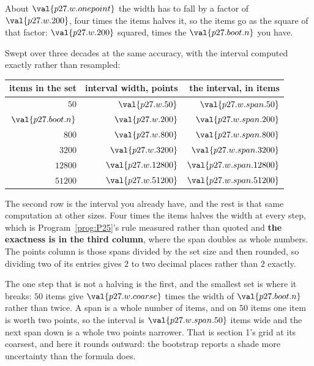 \begin{fr}
\begin{ansblock}
About $\val{p27.w.onepoint}$ \dash{} the width has to fall by a factor of
$\val{p27.w.200}$, four times the items halves it, so the items go as the
square of that factor: $\val{p27.w.200}$ squared, times the
$\val{p27.boot.n}$ you have.
\end{ansblock}

Swept over three decades at the same accuracy, with the interval computed
exactly rather than resampled:

\begin{center}
\begin{tabular}{rrr}
\toprule
items in the set & interval width, points & the interval, in items \\
\midrule
$50$ & $\val{p27.w.50}$ & $\val{p27.w.span.50}$ \\
$\val{p27.boot.n}$ & $\val{p27.w.200}$ & $\val{p27.w.span.200}$ \\
$800$ & $\val{p27.w.800}$ & $\val{p27.w.span.800}$ \\
$\num{3200}$ & $\val{p27.w.3200}$ & $\val{p27.w.span.3200}$ \\
$\num{12800}$ & $\val{p27.w.12800}$ & $\val{p27.w.span.12800}$ \\
$\num{51200}$ & $\val{p27.w.51200}$ & $\val{p27.w.span.51200}$ \\
\bottomrule
\end{tabular}
\end{center}

The second row is the interval you already have, and the rest is that same
computation at other sizes. Four times the items halves the width at every
step, which is Program~\ref{prog:P25}'s rule measured rather than quoted
\dash{} and \textbf{the exactness is in the third column}, where the span
doubles as whole numbers. The points column is those spans divided by the set
size and then rounded, so dividing two of its entries gives $2$ to two
decimal places rather than $2$ exactly.

The one step that is not a halving is the first, and the smallest set is
where it breaks: $50$ items give $\val{p27.w.coarse}$ times the width of
$\val{p27.boot.n}$ rather than twice. A span is a whole number of items, and
on $50$ items one item is worth two points, so the interval is
$\val{p27.w.span.50}$ items wide and the next span down is a whole two points
narrower. That is section 1's grid at its coarsest, and here it rounds
outward: the bootstrap reports a shade more uncertainty than the formula
does.


\end{fr}
